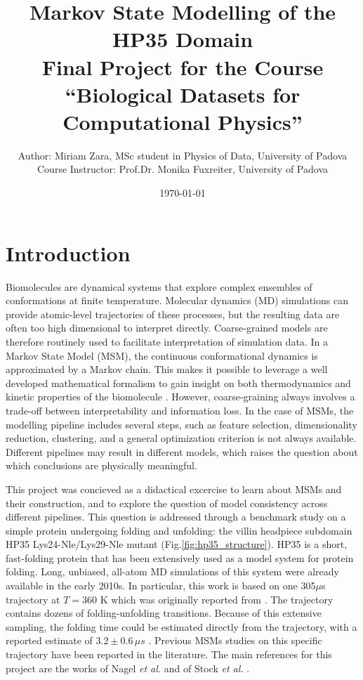 \documentclass[prl,twocolumn]{revtex4-1}
\begin{document}
\title{
Markov State Modelling of the HP35 Domain\\
{\large Final Project for the Course ``Biological Datasets for Computational Physics''}
}
\author{Author: Miriam Zara, MSc student in Physics of Data, University of Padova \\
Course Instructor: Prof.Dr. Monika Fuxreiter, University of Padova \\
}
\date{\today}




\maketitle

\section{Introduction}
Biomolecules are dynamical systems that explore complex ensembles of conformations at finite temperature. Molecular dynamics (MD) simulations can provide atomic-level trajectories of these processes, but the resulting data are often too high dimensional to interpret directly. Coarse-grained models are therefore routinely used to facilitate interpretation of simulation data.
In a Markov State Model (MSM), the continuous conformational dynamics is approximated by a Markov chain. This makes it possible to leverage a well developed mathematical formalism 
to gain insight on both thermodynamics and kinetic properties of the biomolecule \cite{thebible}.
However, coarse-graining always involves a trade-off between interpretability and information loss. In the case of MSMs, the modelling pipeline includes several steps, such as feature selection, dimensionality reduction, clustering,  and a general optimization criterion is not always available. Different pipelines may result in different models, which raises
the question about which conclusions are physically meaningful.

This project was concieved as a didactical excercise to learn about MSMs and their construction, and to explore the question of model consistency across different pipelines.
This question is addressed through a benchmark study on a simple protein undergoing folding and unfolding: the villin headpiece subdomain HP35 Lys24-Nle/Lys29-Nle mutant (Fig.\ref{fig:hp35_structure}). 
HP35 is a short, fast-folding protein that has been extensively used as a model system for protein folding. Long, unbiased, all-atom MD simulations of this system were already available in the early 2010s. In particular, this work is based on one 305$\mu$s trajectory  at $T = 360$ K which was originally reported from \cite{Lindorff-Larsen2011}. 
The trajectory contains dozens of folding-unfolding transitions. Because of this extensive sampling, the folding time could be estimated directly from the trajectory, with a reported estimate of $3.2\pm0.6\,\mu s$ \cite{Piana2012}. 
Previous MSMs studies on this specific trajectory have been reported in the literature. The main references for this project are the works of Nagel \textit{et al.} \cite{selecting_features} and of Stock \textit{et al.} \cite{hierarchical_hp35}. 
\end{document}
